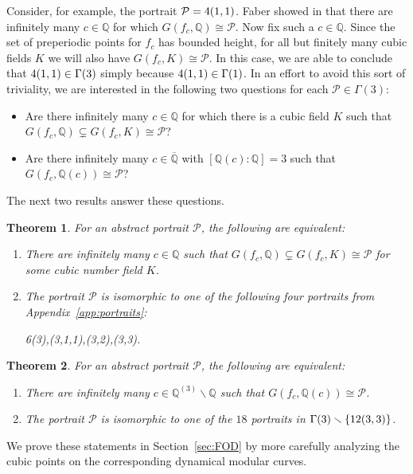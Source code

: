 \documentclass[12pt]{amsart}
\newtheorem{thm}{Theorem}[section]
\theoremstyle{definition}
\newcommand{\bbQ}{\mathbb{Q}}
\newcommand{\calP}{\mathcal{P}}
\newcommand{\QQbar}{\overline{\bbQ}}
\numberwithin{equation}{section}
\begin{document}
Consider, for example, the portrait $\calP = \rm 4(1,1)$. Faber showed in \cite{faber:2015} that there are infinitely many $c \in \bbQ$ for which $G(f_c,\bbQ)\cong \calP$. Now fix such a $c \in \bbQ$. Since the set of preperiodic points for $f_c$ has bounded height, for all but finitely many cubic fields $K$ we will also have $G(f_c,K) \cong \calP$. In this case, we are able to conclude that $\rm 4(1,1) \in \Gamma(3)$ simply because $\rm 4(1,1) \in \Gamma(1)$. In an effort to avoid this sort of triviality, we are interested in the following two questions for each $\calP \in \Gamma(3)$:

\begin{itemize}
    \item Are there infinitely many $c \in \bbQ$ for which there is a cubic field $K$ such that $G(f_c,\bbQ) \subsetneq G(f_c,K) \cong \calP$?
    \item Are there infinitely many $c \in \QQbar$ with $[\bbQ(c):\bbQ] = 3$ such that $G(f_c,\bbQ(c)) \cong \calP$?
\end{itemize}

The next two results answer these questions.

\begin{thm}\label{thm:weakly-cubic}
    For an abstract portrait $\calP$, the following are equivalent:
    \begin{enumerate}
    \item There are infinitely many $c \in \bbQ$ such that $G(f_c,\bbQ) \subsetneq G(f_c,K) \cong \calP$ for some cubic number field $K$.
    \item The portrait $\calP$ is isomorphic to one of the following four portraits from Appendix~\ref{app:portraits}:
        \begin{center}
        \rm
        6(3),(3,1,1),(3,2),(3,3).
        \end{center}
    \end{enumerate}
\end{thm}

\begin{thm}\label{thm:strictly-cubic}
    For an abstract portrait $\calP$, the following are equivalent:
    \begin{enumerate}
    \item There are infinitely many $c \in \bbQ^{(3)}\smallsetminus\bbQ$ such that $G(f_c,\bbQ(c)) \cong \calP$.
    \item The portrait $\calP$ is isomorphic to one of the $18$ portraits in $\Gamma(3) \smallsetminus \{{\rm 12(3,3)}\}$.
    \end{enumerate}
\end{thm}
We prove these statements in Section~\ref{sec:FOD} by more carefully analyzing the cubic points on the corresponding dynamical modular curves.
\end{document}
